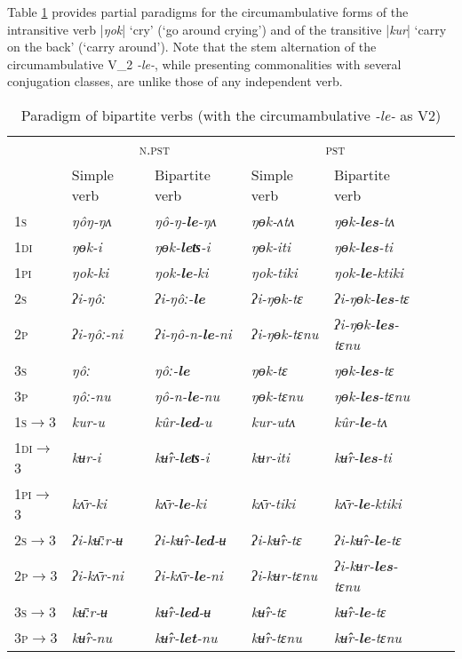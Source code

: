 \documentclass[oneside,a4paper,11pt]{article}
\newcommand{\ipa}[1]{{\phon\textit{#1}}}
\newcommand{\dhatu}[2]{|\ipa{#1}| `#2'}
\begin{document}
Table \ref{tab:kurledu} provides partial paradigms for the circumambulative forms of the intransitive verb \dhatu{ŋok}{cry} (`go around crying') and of the transitive \dhatu{kur}{carry on the back} (`carry around'). Note that the stem alternation of the circumambulative V_2 \ipa{-le-}, while presenting commonalities with several conjugation classes, are unlike those of any independent verb.

\begin{table}%
\caption{Paradigm of bipartite verbs (with the circumambulative \ipa{-le-} as V2)} \label{tab:kurledu}  \centering
\begin{tabular}{lllllll}
\toprule
&\multicolumn{2}{c}{\textsc{n.pst}} &  \multicolumn{2}{c}{\textsc{pst}} \\
&Simple verb &  Bipartite verb &  Simple verb&  Bipartite verb \\
\midrule
\textsc{1s} &  \ipa{ŋôŋ-ŋʌ} & \ipa{ŋô-ŋ-\textbf{le}-ŋʌ} & \ipa{ŋɵk-ʌtʌ} & \ipa{ŋɵk-\textbf{les}-tʌ} \\
\textsc{1di} &  \ipa{ŋɵk-i} & \ipa{ŋɵk-\textbf{leʦ}-i} & \ipa{ŋɵk-iti} & \ipa{ŋɵk-\textbf{les}-ti} \\
\textsc{1pi} &  \ipa{ŋok-ki} & \ipa{ŋok-\textbf{le}-ki} & \ipa{ŋok-tiki} & \ipa{ŋok-\textbf{le}-ktiki} \\
\textsc{2s} &  \ipa{ʔi-ŋôː} & \ipa{ʔi-ŋôː-\textbf{le}} & \ipa{ʔi-ŋɵk-tɛ} & \ipa{ʔi-ŋɵk-\textbf{les}-tɛ} \\
\textsc{2p} &  \ipa{ʔi-ŋôː-ni} & \ipa{ʔi-ŋô-n-\textbf{le}-ni} & \ipa{ʔi-ŋɵk-tɛnu} & \ipa{ʔi-ŋɵk-\textbf{les}-tɛnu}  \\
\textsc{3s} &  \ipa{ŋôː} & \ipa{ŋôː-\textbf{le}} & \ipa{ŋɵk-tɛ} & \ipa{ŋɵk-\textbf{les}-tɛ} \\
\textsc{3p} &  \ipa{ŋôː-nu} & \ipa{ŋô-n-\textbf{le}-nu} & \ipa{ŋɵk-tɛnu} & \ipa{ŋɵk-\textbf{les}-tɛnu} \\
\midrule
\textsc{1s$\rightarrow$3} &  \ipa{kur-u} & \ipa{kûr-\textbf{led}-u} & \ipa{kur-utʌ} & \ipa{kûr-\textbf{le}-tʌ} \\
\textsc{1di$\rightarrow$3} &  \ipa{kʉr-i} & \ipa{kʉ̂r-\textbf{leʦ}-i} & \ipa{kʉr-iti} & \ipa{kʉ̂r-\textbf{les}-ti} \\
\textsc{1pi$\rightarrow$3} &  \ipa{kʌ̄r-ki} & \ipa{kʌ̄r-\textbf{le}-ki} & \ipa{kʌ̄r-tiki} & \ipa{kʌ̄r-\textbf{le}-ktiki} \\
\textsc{2s$\rightarrow$3} &  \ipa{ʔi-kʉ̄ːr-ʉ} & \ipa{ʔi-kʉ̂r-\textbf{led}-ʉ} & \ipa{ʔi-kʉ̂r-tɛ} & \ipa{ʔi-kʉ̂r-\textbf{le}-tɛ} \\
\textsc{2p$\rightarrow$3} &  \ipa{ʔi-kʌ̄r-ni} & \ipa{ʔi-kʌ̄r-\textbf{le}-ni} & \ipa{ʔi-kʉr-tɛnu} & \ipa{ʔi-kʉr-\textbf{les}-tɛnu} \\
\textsc{3s$\rightarrow$3} &  \ipa{kʉ̄ːr-ʉ} & \ipa{kʉ̂r-\textbf{led}-ʉ} & \ipa{kʉ̂r-tɛ} & \ipa{kʉ̂r-\textbf{le}-tɛ} \\
\textsc{3p$\rightarrow$3} &  \ipa{kʉ̂r-nu} & \ipa{kʉ̂r-\textbf{let}-nu} & \ipa{kʉ̂r-tɛnu} & \ipa{kʉ̂r-\textbf{le}-tɛnu} \\
\bottomrule
\end{tabular}
\end{table}
\end{document}
